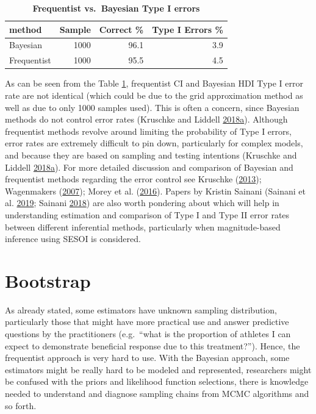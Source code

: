 \documentclass[
]{book}
\begin{document}
\begin{table}

\caption{\label{tab:bayes-type-i-error}\textbf{Frequentist vs.~Bayesian Type I errors}}
\centering
\begin{tabular}[t]{lrrr}
\toprule
method & Sample & Correct \% & Type I Errors \%\\
\midrule
Bayesian & 1000 & 96.1 & 3.9\\
Frequentist & 1000 & 95.5 & 4.5\\
\bottomrule
\end{tabular}
\end{table}

As can be seen from the Table \ref{tab:bayes-type-i-error}, frequentist CI and Bayesian HDI Type I error rate are not identical (which could be due to the grid approximation method as well as due to only 1000 samples used). This is often a concern, since Bayesian methods do not control error rates (Kruschke and Liddell \protect\hyperlink{ref-kruschkeBayesianDataAnalysis2018}{2018}\protect\hyperlink{ref-kruschkeBayesianDataAnalysis2018}{a}). Although frequentist methods revolve around limiting the probability of Type I errors, error rates are extremely difficult to pin down, particularly for complex models, and because they are based on sampling and testing intentions (Kruschke and Liddell \protect\hyperlink{ref-kruschkeBayesianDataAnalysis2018}{2018}\protect\hyperlink{ref-kruschkeBayesianDataAnalysis2018}{a}). For more detailed discussion and comparison of Bayesian and frequentist methods regarding the error control see Kruschke (\protect\hyperlink{ref-kruschkeBayesianEstimationSupersedes2013}{2013}); Wagenmakers (\protect\hyperlink{ref-wagenmakersPracticalSolutionPervasive2007}{2007}); Morey et al. (\protect\hyperlink{ref-moreyFallacyPlacingConfidence2016}{2016}). Papers by Kristin Sainani (Sainani et al. \protect\hyperlink{ref-sainaniMagnitudeBasedInference2019}{2019}; Sainani \protect\hyperlink{ref-sainaniProblemMagnitudebasedInference2018}{2018}) are also worth pondering about which will help in understanding estimation and comparison of Type I and Type II error rates between different inferential methods, particularly when magnitude-based inference using SESOI is considered.

\hypertarget{bootstrap}{%
\chapter{Bootstrap}\label{bootstrap}}

As already stated, some estimators have unknown sampling distribution, particularly those that might have more practical use and answer predictive questions by the practitioners (e.g.~``what is the proportion of athletes I can expect to demonstrate beneficial response due to this treatment?''). Hence, the frequentist approach is very hard to use. With the Bayesian approach, some estimators might be really hard to be modeled and represented, researchers might be confused with the priors and likelihood function selections, there is knowledge needed to understand and diagnose sampling chains from MCMC algorithms and so forth.
\end{document}
